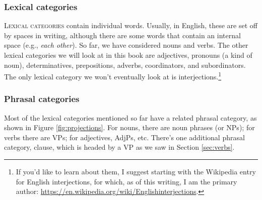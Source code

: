 \subsubsection*{Lexical categories}

\textsc{Lexical categories} contain individual words. Usually, in English, these are set off by spaces in writing, although there are some words that contain an internal space (e.g., \textit{each other}). So far, we have considered nouns and verbs. The other lexical categories we will look at in this book are adjectives, pronouns (a kind of noun), determinatives, prepositions, adverbs, coordinators, and subordinators. The only lexical category we won't eventually look at is interjections.\footnote{If you'd like to learn about them, I suggest starting with the Wikipedia entry for English interjections, for which, as of this writing, I am the primary author: \href{https://en.wikipedia.org/wiki/English\textunderscore interjections}{https://en.wikipedia.org/wiki/English\textunderscore interjections}.}

\subsubsection*{Phrasal categories}

Most of the lexical categories mentioned so far have a related phrasal category, as shown in Figure \ref{fig:projections}. For nouns, there are noun phrases (or NPs); for verbs there are VPs; for adjectives, AdjPs, etc. There's one additional phrasal category, clause, which is headed by a VP as we saw in Section \ref{sec:verbs}.


